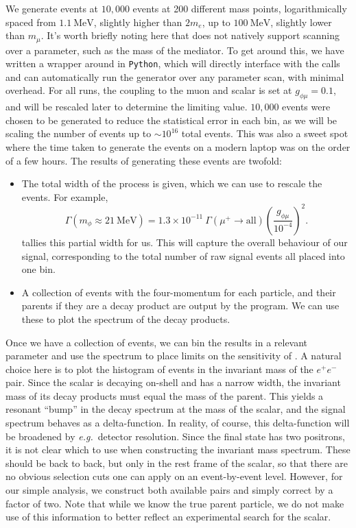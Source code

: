 We generate events at $10,000$ events at 200 different mass points, logarithmically spaced from $1.1~\textrm{MeV}$, slightly higher than $2m_e$, up to $100~\textrm{MeV}$, slightly lower than $m_\mu$.
It's worth briefly noting here that \madgraph does not natively support scanning over a parameter, such as the mass of the mediator.
To get around this, we have written a wrapper around \madgraph in \texttt{Python}, which will directly interface with the \madgraph calls and can automatically run the generator over any parameter scan, with minimal overhead.
For all runs, the coupling to the muon and scalar is set at $g_{\phi\mu} = 0.1$, and will be rescaled later to determine the limiting value.
$10,000$ events were chosen to be generated to reduce the statistical error in each bin, as we will be scaling the number of events up to $\sim 10^{16}$ total events.
This was also a sweet spot where the time taken to generate the events on a modern laptop was on the order of a few hours.
The results of generating these events are twofold:
\begin{itemize}
    \item{The total width of the process is given, which we can use to rescale the events. For example,
        \begin{equation}
            \Gamma(m_\phi \approx 21~\textrm{MeV}) = 1.3\times 10^{-11}~\Gamma(\mu^+ \rightarrow \textrm{all}) \left(\frac{g_{\phi\mu}}{10^{-4}}\right)^2\textrm{.}
        \end{equation}
        \madgraph tallies this partial width for us. This will capture the overall behaviour of our signal, corresponding to the total number of raw signal events all placed into one bin.}
    \item{A collection of events with the four-momentum for each particle, and their parents if they are a decay product are output by the program. We can use these to plot the spectrum of the decay products.}
\end{itemize}

Once we have a collection of events, we can bin the results in a relevant parameter and use the spectrum to place limits on the sensitivity of \mueee.
A natural choice here is to plot the histogram of events in the invariant mass of the $e^+ e^-$ pair.
Since the scalar is decaying on-shell and has a narrow width, the invariant mass of its decay products must equal the mass of the parent.
This yields a resonant ``bump'' in the decay spectrum at the mass of the scalar, and the signal spectrum behaves as a delta-function.
In reality, of course, this delta-function will be broadened by {\em e.g.}\ detector resolution.
Since the final state has two positrons, it is not clear which to use when constructing the invariant mass spectrum.
These should be back to back, but only in the rest frame of the scalar, so that there are no obvious selection cuts one can apply on an event-by-event level.
However, for our simple analysis, we construct both available pairs and simply correct by a factor of two.
Note that while we know the true parent particle, we do not make use of this information to better reflect an experimental search for the scalar.

